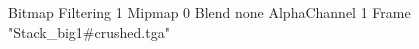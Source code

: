 {Bitmap
	{Filtering 1}
	{Mipmap 0}
	{Blend none}
	{AlphaChannel 1}
	{Frame "Stack_big1#crushed.tga"}
}
